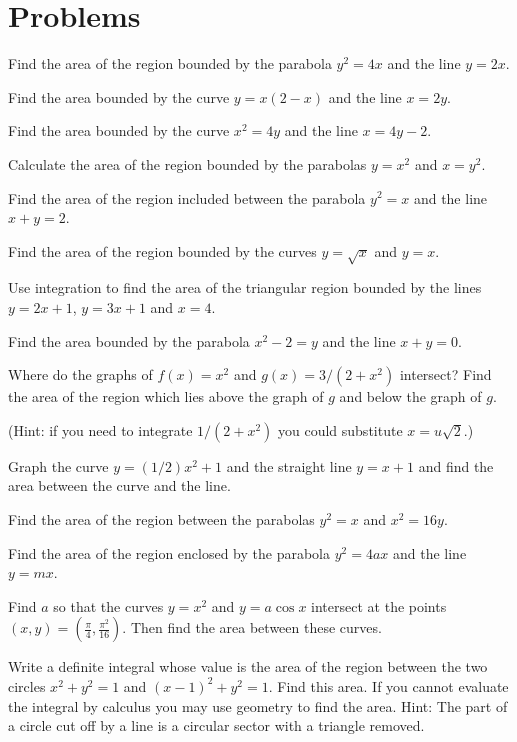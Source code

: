 \section{Problems}
\problemfont
\begin{multicols}{2}\setlength{\parindent}{0pt}
\problem Find the area of the region bounded by the parabola $y^2=4x$ and
the line $y=2x$.

\problem Find the area bounded by the curve $y=x(2-x)$ and the line $x=2y$.

\problem Find the area bounded by the curve $x^2=4y$ and the line $x=4y-2$.

\problem Calculate the area of the region bounded by the parabolas $y=x^2$
and $x=y^2$.

\problem Find the area of the region included between the parabola $y^2=x$
and the line $x+y=2$.

\problem Find the area of the region bounded by the curves $y=\sqrt{x}$ and
$y=x$.

\problem Use integration to find the area of the triangular region bounded
by the lines $y=2x+1$, $y=3x+1$ and $x=4$.


\problem Find the area bounded by the parabola $x^2-2=y$ and the line
$x+y=0$.

\problem Where do the graphs of $f(x) = x^2$ and $g(x) = 3/(2+x^2)$
intersect?  Find the area of the region which lies above the graph of $g$
and below the graph of $g$.

(Hint: if you need to integrate $1/(2+x^2)$ you could substitute
$x=u\sqrt2$.)

\problem Graph the curve $y=(1/2)x^2+1$ and the straight line $y=x+1$ and
find the area between the curve and the line.

\problem Find the area of the region between the parabolas $y^2=x$ and
$x^2=16y$.

\problem Find the area of the region enclosed by the parabola $y^2=4ax$ and
the line $y=mx$.

\problem Find $a$ so that the curves $y=x^2$ and $y=a\cos x$ intersect at
the points $(x,y)=(\frac\pi4, \frac{\pi^2}{16})$. Then find the area
between these curves.

\problem \groupproblem Write a definite integral whose value is the
area of the region between the two circles $x^2+y^2=1$ and
$(x-1)^2+y^2=1$.  Find this area.  If you cannot evaluate the integral
by calculus you may use geometry to find the area.  Hint: The part of
a circle cut off by a line is a circular sector with a triangle
removed.

\end{multicols}
\noproblemfont
